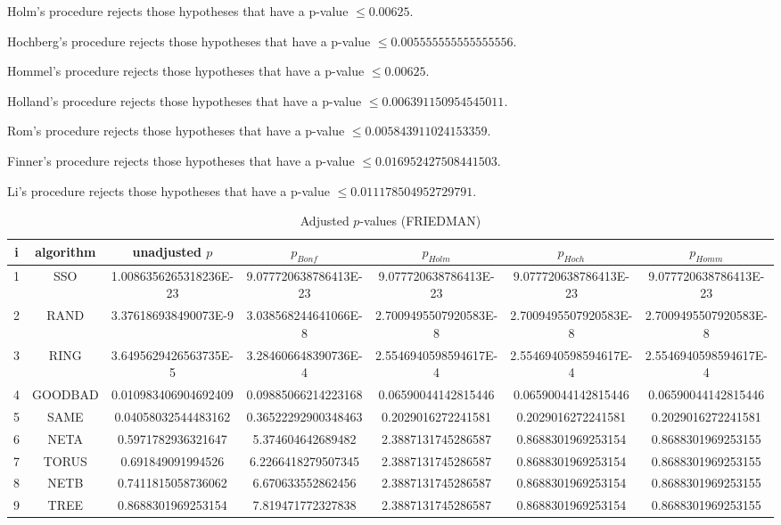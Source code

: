 \documentclass[a4paper,10pt]{article}
\begin{document}
\begin{landscape}
Holm's procedure rejects those hypotheses that have a p-value $\le0.00625$.


Hochberg's procedure rejects those hypotheses that have a p-value $\le0.005555555555555556$.


Hommel's procedure rejects those hypotheses that have a p-value $\le0.00625$.


Holland's procedure rejects those hypotheses that have a p-value $\le0.006391150954545011$.


Rom's procedure rejects those hypotheses that have a p-value $\le0.005843911024153359$.


Finner's procedure rejects those hypotheses that have a p-value $\le0.016952427508441503$.


Li's procedure rejects those hypotheses that have a p-value $\le0.011178504952729791$.



\newpage

\begin{table}[!htp]
\centering\scriptsize
\caption{Adjusted $p$-values (FRIEDMAN)}
\begin{tabular}{ccccccc}
i&algorithm&unadjusted $p$&$p_{Bonf}$&$p_{Holm}$&$p_{Hoch}$&$p_{Homm}$\\
\hline
1& SSO&1.0086356265318236E-23&9.077720638786413E-23&9.077720638786413E-23&9.077720638786413E-23&9.077720638786413E-23\\
2& RAND&3.376186938490073E-9&3.038568244641066E-8&2.7009495507920583E-8&2.7009495507920583E-8&2.7009495507920583E-8\\
3& RING&3.6495629426563735E-5&3.284606648390736E-4&2.5546940598594617E-4&2.5546940598594617E-4&2.5546940598594617E-4\\
4& GOODBAD&0.010983406904692409&0.09885066214223168&0.06590044142815446&0.06590044142815446&0.06590044142815446\\
5& SAME&0.04058032544483162&0.36522292900348463&0.2029016272241581&0.2029016272241581&0.2029016272241581\\
6& NETA&0.5971782936321647&5.374604642689482&2.3887131745286587&0.8688301969253154&0.8688301969253155\\
7& TORUS&0.691849091994526&6.2266418279507345&2.3887131745286587&0.8688301969253154&0.8688301969253155\\
8& NETB&0.7411815058736062&6.670633552862456&2.3887131745286587&0.8688301969253154&0.8688301969253155\\
9& TREE&0.8688301969253154&7.819471772327838&2.3887131745286587&0.8688301969253154&0.8688301969253155\\
\hline
\end{tabular}
\end{table}


\end{landscape}
\end{document}
